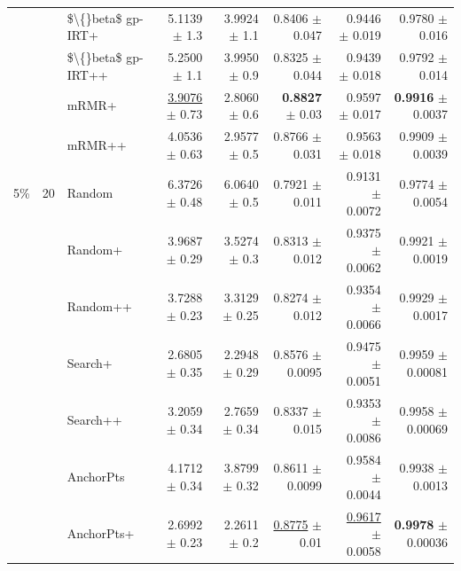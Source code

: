 \begin{longtable}{llp{}rrrrr}
 &  & \$\textbackslash\{\}beta\$ gp-IRT+ & 5.1139 {\scriptsize $\pm$ 1.3} & 3.9924 {\scriptsize $\pm$ 1.1} & 0.8406 {\scriptsize $\pm$ 0.047} & 0.9446 {\scriptsize $\pm$ 0.019} & 0.9780 {\scriptsize $\pm$ 0.016} \\
 &  & \$\textbackslash\{\}beta\$ gp-IRT++ & 5.2500 {\scriptsize $\pm$ 1.1} & 3.9950 {\scriptsize $\pm$ 0.9} & 0.8325 {\scriptsize $\pm$ 0.044} & 0.9439 {\scriptsize $\pm$ 0.018} & 0.9792 {\scriptsize $\pm$ 0.014} \\
 &  & mRMR+ & \underline{3.9076} {\scriptsize $\pm$ 0.73} & 2.8060 {\scriptsize $\pm$ 0.6} & \textbf{0.8827} {\scriptsize $\pm$ 0.03} & 0.9597 {\scriptsize $\pm$ 0.017} & \textbf{0.9916} {\scriptsize $\pm$ 0.0037} \\
 &  & mRMR++ & 4.0536 {\scriptsize $\pm$ 0.63} & 2.9577 {\scriptsize $\pm$ 0.5} & 0.8766 {\scriptsize $\pm$ 0.031} & 0.9563 {\scriptsize $\pm$ 0.018} & 0.9909 {\scriptsize $\pm$ 0.0039} \\
\midrule
5\% & 20 & Random & 6.3726 {\scriptsize $\pm$ 0.48} & 6.0640 {\scriptsize $\pm$ 0.5} & 0.7921 {\scriptsize $\pm$ 0.011} & 0.9131 {\scriptsize $\pm$ 0.0072} & 0.9774 {\scriptsize $\pm$ 0.0054} \\
 &  & Random+ & 3.9687 {\scriptsize $\pm$ 0.29} & 3.5274 {\scriptsize $\pm$ 0.3} & 0.8313 {\scriptsize $\pm$ 0.012} & 0.9375 {\scriptsize $\pm$ 0.0062} & 0.9921 {\scriptsize $\pm$ 0.0019} \\
 &  & Random++ & 3.7288 {\scriptsize $\pm$ 0.23} & 3.3129 {\scriptsize $\pm$ 0.25} & 0.8274 {\scriptsize $\pm$ 0.012} & 0.9354 {\scriptsize $\pm$ 0.0066} & 0.9929 {\scriptsize $\pm$ 0.0017} \\
 &  & Search+ & 2.6805 {\scriptsize $\pm$ 0.35} & 2.2948 {\scriptsize $\pm$ 0.29} & 0.8576 {\scriptsize $\pm$ 0.0095} & 0.9475 {\scriptsize $\pm$ 0.0051} & 0.9959 {\scriptsize $\pm$ 0.00081} \\
 &  & Search++ & 3.2059 {\scriptsize $\pm$ 0.34} & 2.7659 {\scriptsize $\pm$ 0.34} & 0.8337 {\scriptsize $\pm$ 0.015} & 0.9353 {\scriptsize $\pm$ 0.0086} & 0.9958 {\scriptsize $\pm$ 0.00069} \\
 &  & AnchorPts & 4.1712 {\scriptsize $\pm$ 0.34} & 3.8799 {\scriptsize $\pm$ 0.32} & 0.8611 {\scriptsize $\pm$ 0.0099} & 0.9584 {\scriptsize $\pm$ 0.0044} & 0.9938 {\scriptsize $\pm$ 0.0013} \\
 &  & AnchorPts+ & 2.6992 {\scriptsize $\pm$ 0.23} & 2.2611 {\scriptsize $\pm$ 0.2} & \underline{0.8775} {\scriptsize $\pm$ 0.01} & \underline{0.9617} {\scriptsize $\pm$ 0.0058} & \textbf{0.9978} {\scriptsize $\pm$ 0.00036} \\

\end{longtable}
